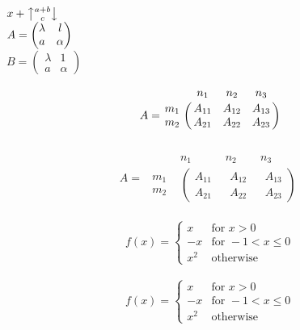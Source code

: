 \documentclass[11pt]{article}
\begin{document}
$x+{a+b \atopwithdelims\uparrow\downarrow c}$ \\

$A=\begin{pmatrix}
\lambda & l \cr 
a & \alpha \cr
\end{pmatrix}$ \\

$B=\left(\begin{array}{cc}
\lambda & 1 \\
a & \alpha
\end{array} \right)$

$$A=\bordermatrix{& n_1 & n_2 & n_3 \cr
m_1 & A_{11} & A_{12} & A_{13} \cr
m_2 & A_{21} & A_{22} & A_{23} \cr}$$ \\

\[ 
A = \begin{array}{cccc} & n_1 & n_2 & n_3 \\
\begin{array}{c} m_1 \\ m_2 \end{array} &
\left(
\begin{array}{c} A_{11} \\ A_{21} \end{array} \right. &
\begin{array}{c} A_{12} \\ A_{22} \end{array} & \left.
\begin{array}{c} A_{13} \\ A_{23} \end{array} \right)
\end{array} 
\] \\


$$f(x)=\left\{\begin{array}{ll} x & \mbox{for } x > 0 \\ -x & \mbox{for } -1 < x \leq 0 \\ x^2 & \mbox{otherwise} \end{array} \right.$$ \\

$$f(x)=\left\{\begin{array}{rl} x & \mbox{for } x > 0 \\ -x & \mbox{for } -1<x\leq 0 \\ x^2 & \mbox{otherwise}
\end{array} \right.$$ \\
\end{document}
